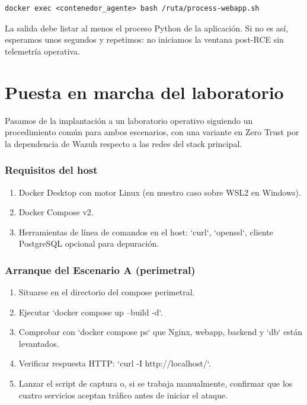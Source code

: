 \documentclass[11pt,spanish,listoffigures,listoftables]{tfgetsinf}
\begin{document}
        \begin{lstlisting}
docker exec <contenedor_agente> bash /ruta/process-webapp.sh
        \end{lstlisting}
        
        La salida debe listar al menos el proceso Python de la aplicación. Si no es así, esperamos unos segundos y repetimos: no iniciamos la ventana post-RCE sin telemetría operativa.

    \section{Puesta en marcha del laboratorio}
    \label{sec:5.4}
    
    Pasamos de la implantación a un laboratorio operativo siguiendo un procedimiento común para ambos escenarios, con una variante en Zero Trust por la dependencia de Wazuh respecto a las redes del stack principal.
    
    \subsubsection{Requisitos del host}
    \begin{enumerate}
        \item Docker Desktop con motor Linux (en nuestro caso sobre WSL2 en Windows).
        \item Docker Compose v2.
        \item Herramientas de línea de comandos en el host: `curl`, `openssl`, cliente PostgreSQL opcional para depuración.
    \end{enumerate}
    
    \subsubsection{Arranque del Escenario A (perimetral)}
    \begin{enumerate}
        \item Situarse en el directorio del compose perimetral.
        \item Ejecutar `docker compose up --build -d`.
        \item Comprobar con `docker compose ps` que Nginx, webapp, backend y `db` están levantados.
        \item Verificar respuesta HTTP: `curl -I http://localhost/`.
        \item Lanzar el script de captura o, si se trabaja manualmente, confirmar que los cuatro servicios aceptan tráfico antes de iniciar el ataque.
    \end{enumerate}
    
\end{document}
